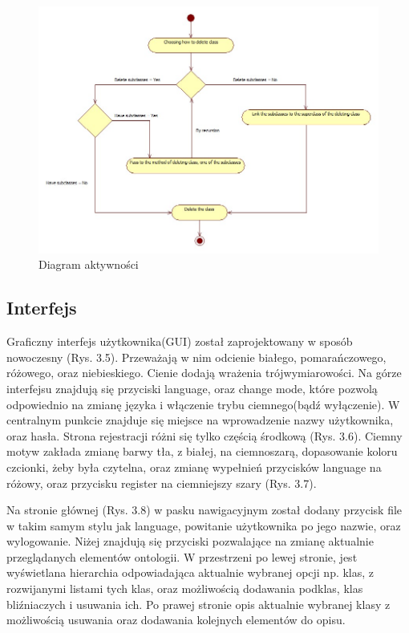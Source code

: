 \documentclass[a4paper,12pt, twoside]{book} %
\begin{document}
\begin{figure}[h]
	\centering
	\includegraphics[scale=0.5]{ActivityClassDiagram.jpg}
	\caption{Diagram aktywności}
\end{figure}



\subsection{Interfejs}
Graficzny interfejs użytkownika(GUI) został zaprojektowany w sposób nowoczesny (Rys. 3.5). Przeważają w nim odcienie białego, pomarańczowego, różowego, oraz niebieskiego. Cienie dodają wrażenia trójwymiarowości. Na górze interfejsu znajdują się przyciski language, oraz change mode, które pozwolą odpowiednio na zmianę języka i włączenie trybu ciemnego(bądź wyłączenie). W centralnym punkcie znajduje się miejsce na wprowadzenie nazwy użytkownika, oraz hasła. Strona rejestracji różni się tylko częścią środkową (Rys. 3.6). Ciemny motyw zakłada zmianę barwy tła, z białej, na ciemnoszarą, dopasowanie koloru czcionki, żeby była czytelna, oraz zmianę wypełnień przycisków language na różowy, oraz przycisku register na ciemniejszy szary (Rys. 3.7).

Na stronie głównej (Rys. 3.8) w pasku nawigacyjnym  został dodany przycisk file w takim samym stylu jak language, powitanie użytkownika po jego nazwie, oraz wylogowanie. Niżej znajdują się przyciski pozwalające na zmianę aktualnie przeglądanych elementów ontologii.
W przestrzeni po lewej stronie, jest wyświetlana hierarchia odpowiadająca aktualnie wybranej opcji np. klas, z rozwijanymi listami tych klas, oraz możliwością dodawania podklas, klas bliźniaczych i usuwania ich. Po prawej stronie opis aktualnie wybranej klasy z możliwością usuwania oraz dodawania kolejnych elementów do opisu.
\end{document}
